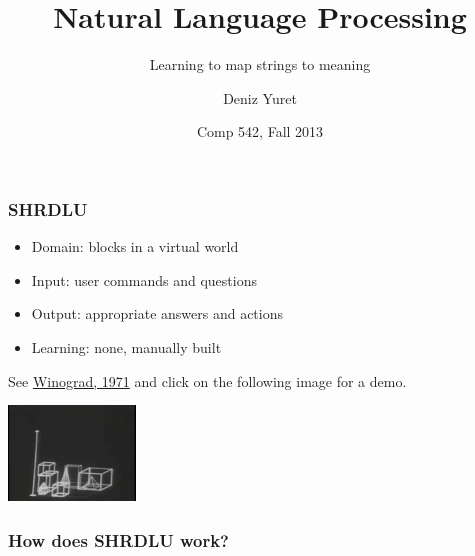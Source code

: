 \documentclass[ignorenonframetext]{beamer}
\title{Natural Language Processing}
\subtitle{Learning to map strings to meaning}
\author{Deniz Yuret}
\date{Comp 542, Fall 2013}
\begin{document}
\begin{frame}
\maketitle
\end{frame}

\begin{frame}\frametitle{SHRDLU}

\begin{itemize}
\item Domain: blocks in a virtual world
\item Input: user commands and questions
\item Output: appropriate answers and actions
\item Learning: none, manually built
\end{itemize}

See \href{http://hci.stanford.edu/~winograd/shrdlu}{Winograd, 1971}
and click on the following image for a demo.

\begin{center}
\href{http://youtu.be/QAJz4YKUwqw}{
\includegraphics[]{winograd-shrdlu.png}}
\end{center}

\end{frame}

\begin{frame}\frametitle{How does SHRDLU work?}

\end{frame}
\end{document}
